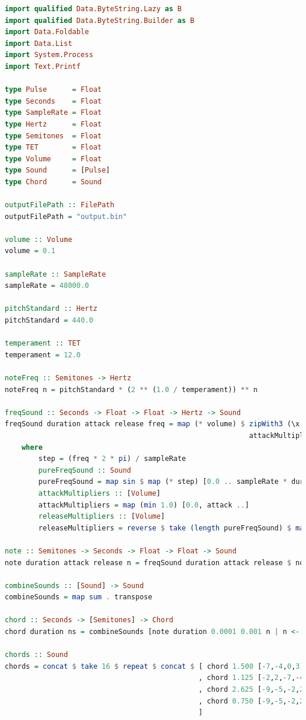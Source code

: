 \documentclass[11pt]{article}
\begin{document}
\begin{lstlisting}[language=Haskell, basicstyle=\tiny]
import qualified Data.ByteString.Lazy as B
import qualified Data.ByteString.Builder as B
import Data.Foldable
import Data.List
import System.Process
import Text.Printf

type Pulse      = Float
type Seconds    = Float
type SampleRate = Float
type Hertz      = Float
type Semitones  = Float
type TET        = Float
type Volume     = Float
type Sound      = [Pulse]
type Chord      = Sound

outputFilePath :: FilePath
outputFilePath = "output.bin"

volume :: Volume
volume = 0.1

sampleRate :: SampleRate
sampleRate = 48000.0

pitchStandard :: Hertz
pitchStandard = 440.0

temperament :: TET
temperament = 12.0

noteFreq :: Semitones -> Hertz
noteFreq n = pitchStandard * (2 ** (1.0 / temperament)) ** n

freqSound :: Seconds -> Float -> Float -> Hertz -> Sound
freqSound duration attack release freq = map (* volume) $ zipWith3 (\x y z -> x * y * z)
                                                          attackMultipliers releaseMultipliers pureFreqSound
    where
        step = (freq * 2 * pi) / sampleRate
        pureFreqSound :: Sound
        pureFreqSound = map sin $ map (* step) [0.0 .. sampleRate * duration]
        attackMultipliers :: [Volume]
        attackMultipliers = map (min 1.0) [0.0, attack ..]
        releaseMultipliers :: [Volume]
        releaseMultipliers = reverse $ take (length pureFreqSound) $ map (min 1.0) [0.0, release ..]

note :: Semitones -> Seconds -> Float -> Float -> Sound
note duration attack release n = freqSound duration attack release $ noteFreq n

combineSounds :: [Sound] -> Sound
combineSounds = map sum . transpose

chord :: Seconds -> [Semitones] -> Chord
chord duration ns = combineSounds [note duration 0.0001 0.001 n | n <- ns]

chords :: Sound
chords = concat $ take 16 $ repeat $ concat $ [ chord 1.500 [-7,-4,0,3]
                                              , chord 1.125 [-2,2,-7,-4]
                                              , chord 2.625 [-9,-5,-2,2]
                                              , chord 0.750 [-9,-5,-2,2]
                                              ]


\end{lstlisting}
\end{document}

